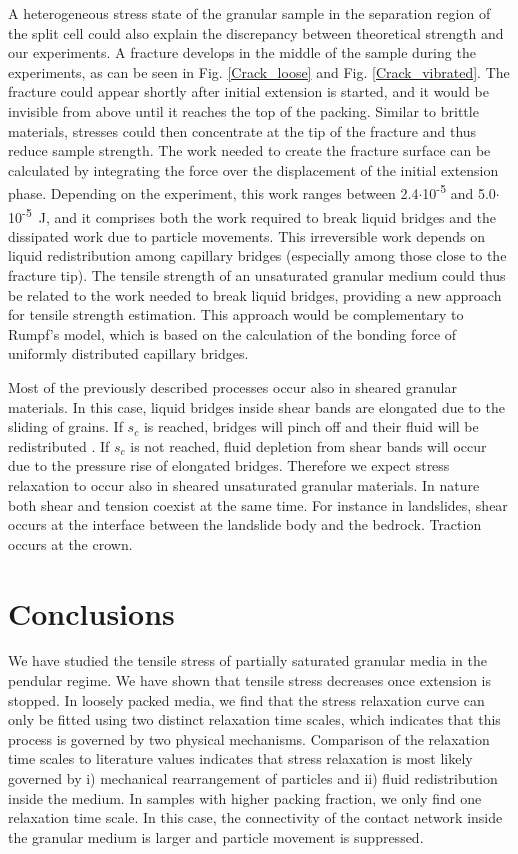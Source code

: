 A heterogeneous stress state of the granular sample in the separation region of the split cell could also explain the discrepancy between theoretical strength and our experiments. A fracture develops in the middle of the sample during the experiments, as can be seen in Fig. \ref{Crack_loose} and Fig. \ref{Crack_vibrated}. The fracture could appear shortly after initial extension is started, and it would be invisible from above until it reaches the top of the packing. Similar to brittle materials, stresses could then concentrate at the tip of the fracture and thus reduce sample strength. The work needed to create the fracture surface can be calculated by integrating the force over the displacement of the initial extension phase. Depending on the experiment, this work ranges between 2.4$\cdot$10\textsuperscript{-5} and 5.0$\cdot$10\textsuperscript{-5}~\si{J}, and it comprises both the work required to break liquid bridges and the dissipated work due to particle movements. This irreversible work depends on liquid redistribution among capillary bridges (especially among those close to the fracture tip). The tensile strength of an unsaturated granular medium could thus be related to the work needed to break liquid bridges, providing a new approach for tensile strength estimation. This approach would be complementary to Rumpf's model, which is based on the calculation of the bonding force of uniformly distributed capillary bridges.

Most of the previously described processes occur also in sheared granular materials. In this case, liquid bridges inside shear bands are elongated due to the sliding of grains. If $s_c$ is reached, bridges will pinch off and their fluid will be redistributed \cite{Mani2013,Mani2012}. If $s_c$ is not reached, fluid depletion from shear bands will occur due to the pressure rise of elongated bridges. Therefore we expect stress relaxation to occur also in sheared unsaturated granular materials. In nature both shear and tension coexist at the same time. For instance in landslides, shear occurs at the interface between the landslide body and the bedrock. Traction occurs at the crown.

\section{Conclusions}
\label{sec:Conclusions}

We have studied the tensile stress of partially saturated granular media in the pendular regime. We have shown that tensile stress decreases once extension is stopped. In loosely packed media, we find that the stress relaxation curve can only be fitted using two distinct relaxation time scales, which indicates that this process is governed by two physical mechanisms. Comparison of the relaxation time scales to literature values indicates that stress relaxation is most likely governed by i) mechanical rearrangement of particles and ii) fluid redistribution inside the medium. In samples with higher packing fraction, we only find one relaxation time scale. In this case, the connectivity of the contact network inside the granular medium is larger and particle movement is suppressed.

